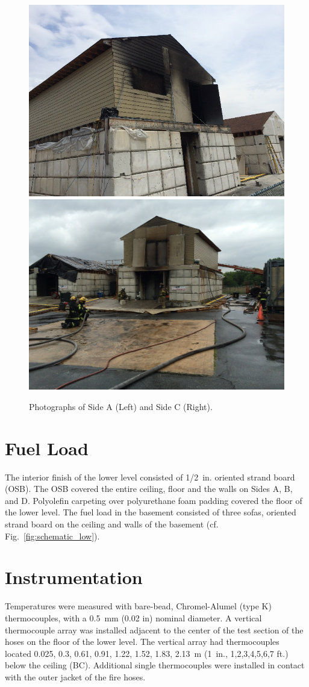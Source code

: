 \documentclass[letterpaper,11pt]{texMemo} %
\begin{document}
\begin{figure}[!ht]
\centering
\includegraphics[width=0.45\columnwidth]{../Figures/Hose_Figures/exterior_a}
\includegraphics[width=0.45\columnwidth]{../Figures/Hose_Figures/exterior_c}
\caption{Photographs of Side A (Left) and Side C (Right). }
\label{fig:exterior}
\end{figure}

\section{Fuel Load}
The interior finish of the lower level consisted of 1/2~in. oriented strand board (OSB).  The OSB covered the entire ceiling, floor and the walls on Sides A, B, and D. Polyolefin carpeting over polyurethane foam padding covered the floor of the lower level.  The fuel load in the basement consisted of three sofas, oriented strand board on the ceiling and walls of the basement (cf. Fig.~\ref{fig:schematic_low}).  

\section{Instrumentation}
Temperatures were measured with bare-bead, Chromel-Alumel (type K) thermocouples, with a 0.5~mm (0.02 in) nominal diameter. A vertical thermocouple array was installed adjacent to the center of the test section of the hoses on the floor of the lower level. The vertical array had thermocouples located 0.025, 0.3, 0.61, 0.91, 1.22, 1.52, 1.83, 2.13~m (1~in., 1,2,3,4,5,6,7 ft.) below the ceiling (BC).  Additional single thermocouples were installed in contact with the outer jacket of the fire hoses.  
\end{document}
